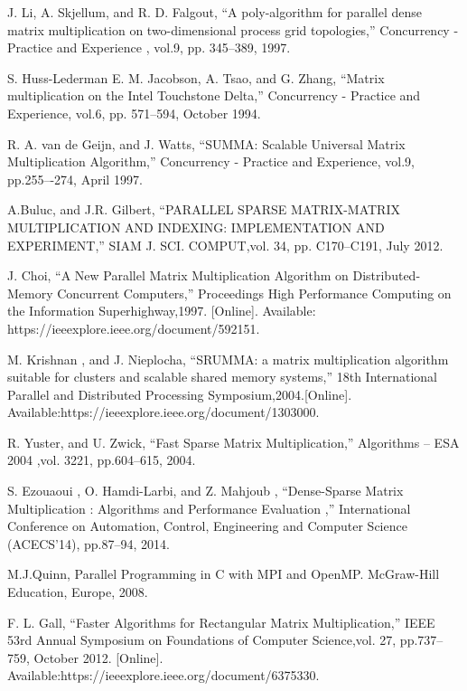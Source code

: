 \documentclass[conference]{IEEEtran}
\begin{document}
\begin{thebibliography}{00}
 J. Li, A. Skjellum, and R. D. Falgout, ``A poly-algorithm for parallel dense matrix multiplication on two-dimensional process grid topologies,'' Concurrency - Practice and Experience , vol.9, pp. 345--389, 1997. 

 S. Huss-Lederman  E. M. Jacobson, A. Tsao, and G. Zhang, ``Matrix multiplication on the Intel Touchstone Delta,'' Concurrency - Practice and Experience, vol.6, pp. 571--594, October 1994. 

 R. A. van de Geijn, and J. Watts, ``SUMMA: Scalable Universal Matrix Multiplication Algorithm,'' Concurrency - Practice and Experience, vol.9, pp.255–-274, April 1997. 

 A.Buluc, and J.R. Gilbert, ``PARALLEL SPARSE MATRIX-MATRIX MULTIPLICATION AND INDEXING: IMPLEMENTATION AND EXPERIMENT,'' SIAM J. SCI. COMPUT,vol. 34, pp. C170--C191, July 2012.

 J. Choi, ``A New Parallel Matrix Multiplication Algorithm on Distributed-Memory Concurrent Computers,''  Proceedings High Performance Computing on the Information Superhighway,1997. [Online].  Available: https://ieeexplore.ieee.org/document/592151.


 M. Krishnan , and J. Nieplocha, ``SRUMMA: a matrix multiplication algorithm suitable for clusters and scalable shared memory systems,''  18th International Parallel and Distributed Processing Symposium,2004.[Online].  Available:https://ieeexplore.ieee.org/document/1303000.


 R. Yuster, and U. Zwick, ``Fast Sparse Matrix Multiplication,''  Algorithms – ESA 2004 ,vol. 3221, pp.604--615, 2004.

 S. Ezouaoui , O. Hamdi-Larbi, and Z. Mahjoub , ``Dense-Sparse Matrix Multiplication : Algorithms and Performance Evaluation ,''  International Conference on Automation, Control, Engineering and Computer Science (ACECS'14), pp.87--94, 2014.

 M.J.Quinn, Parallel Programming in C with MPI and OpenMP. McGraw-Hill Education, Europe, 2008.

 F. L. Gall, ``Faster Algorithms for Rectangular Matrix Multiplication,''  IEEE 53rd Annual Symposium on Foundations of Computer Science,vol. 27, pp.737--759, October 2012. [Online].  Available:https://ieeexplore.ieee.org/document/6375330.




\end{thebibliography}
\end{document}
